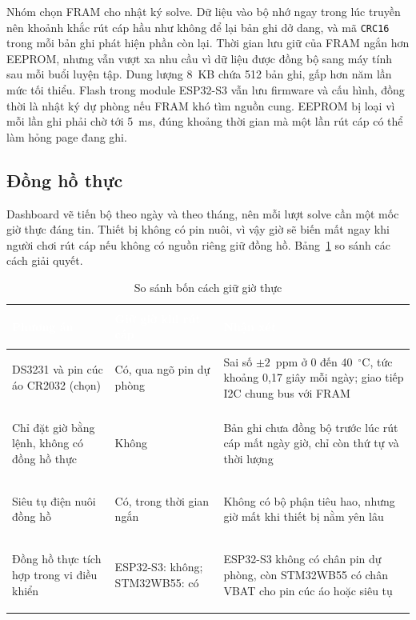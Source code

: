 Nhóm chọn FRAM cho nhật ký solve. Dữ liệu vào bộ nhớ ngay trong lúc truyền nên khoảnh khắc rút cáp hầu như không để lại bản ghi dở dang, và mã \texttt{CRC16} trong mỗi bản ghi phát hiện phần còn lại. Thời gian lưu giữ của FRAM ngắn hơn EEPROM, nhưng vẫn vượt xa nhu cầu vì dữ liệu được đồng bộ sang máy tính sau mỗi buổi luyện tập. Dung lượng 8~KB chứa 512 bản ghi, gấp hơn năm lần mức tối thiểu. Flash trong module ESP32-S3 vẫn lưu firmware và cấu hình, đồng thời là nhật ký dự phòng nếu FRAM khó tìm nguồn cung. EEPROM bị loại vì mỗi lần ghi phải chờ tới 5~ms, đúng khoảng thời gian mà một lần rút cáp có thể làm hỏng page đang ghi.

\subsection{Đồng hồ thực}
\label{sec:rtc}
Dashboard vẽ tiến bộ theo ngày và theo tháng, nên mỗi lượt solve cần một mốc giờ thực đáng tin. Thiết bị không có pin nuôi, vì vậy giờ sẽ biến mất ngay khi người chơi rút cáp nếu không có nguồn riêng giữ đồng hồ. Bảng~\ref{tab:rtc} so sánh các cách giải quyết.

\begin{table}[H]
    \centering
    \renewcommand{\arraystretch}{1.5}
    \caption{So sánh bốn cách giữ giờ thực}
    \label{tab:rtc}
    \begin{tabular}{>{\bfseries\raggedright\arraybackslash}m{4.0cm} >{\raggedright\arraybackslash}m{3.4cm} >{\raggedright\arraybackslash}m{6.8cm}}
        \toprule
        \rowcolor{haitayblue}
        \textcolor{white}{Phương án} & \textcolor{white}{Giữ giờ khi rút cáp} & \textcolor{white}{Nhận xét} \\
        \midrule
        \rowcolor{haitayblue!8}
        DS3231 và pin cúc áo CR2032 (chọn) & Có, qua ngõ pin dự phòng & Sai số $\pm 2$~ppm ở 0 đến 40~$^{\circ}$C, tức khoảng 0,17 giây mỗi ngày; giao tiếp I2C chung bus với FRAM \\
        Chỉ đặt giờ bằng lệnh, không có đồng hồ thực & Không & Bản ghi chưa đồng bộ trước lúc rút cáp mất ngày giờ, chỉ còn thứ tự và thời lượng \\
        \rowcolor{haitayblue!8}
        Siêu tụ điện nuôi đồng hồ & Có, trong thời gian ngắn & Không có bộ phận tiêu hao, nhưng giờ mất khi thiết bị nằm yên lâu \\
        Đồng hồ thực tích hợp trong vi điều khiển & ESP32-S3: không; STM32WB55: có & ESP32-S3 không có chân pin dự phòng, còn STM32WB55 có chân VBAT cho pin cúc áo hoặc siêu tụ \\
        \bottomrule
    \end{tabular}
\end{table}

